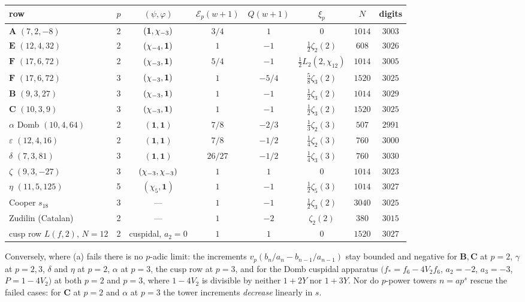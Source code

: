 \begin{verification}
\smallskip
\begin{center}\small
\renewcommand{\arraystretch}{1.2}
\begin{tabular}{@{}l c c c c c c c@{}}
\toprule
row & $p$ & $(\psi,\varphi)$ & $\mathcal E_p(w{+}1)$ & $Q(w{+}1)$ & $\xi_p$ & $N$ & digits\\
\midrule
$\mathbf A$ $(7,2,-8)$    & 2 & $(\mathbf 1,\chi_{-3})$ & $3/4$ & $1$ & $0$ & $1014$ & $3003$\\
$\mathbf E$ $(12,4,32)$   & 2 & $(\chi_{-4},\mathbf 1)$ & $1$ & $-1$ & $\tfrac12\zeta_2(2)$ & $608$ & $3026$\\
$\mathbf F$ $(17,6,72)$   & 2 & $(\chi_{-3},\mathbf 1)$ & $5/4$ & $-1$ & $\tfrac12L_2(2,\chi_{12})$ & $1014$ & $3005$\\
$\mathbf F$ $(17,6,72)$   & 3 & $(\chi_{-3},\mathbf 1)$ & $1$ & $-5/4$ & $\tfrac58\zeta_3(2)$ & $1520$ & $3025$\\
$\mathbf B$ $(9,3,27)$    & 3 & $(\chi_{-3},\mathbf 1)$ & $1$ & $-1$ & $\tfrac12\zeta_3(2)$ & $1014$ & $3029$\\
$\mathbf C$ $(10,3,9)$    & 3 & $(\chi_{-3},\mathbf 1)$ & $1$ & $-1$ & $\tfrac12\zeta_3(2)$ & $1520$ & $3025$\\
$\alpha$ Domb $(10,4,64)$ & 2 & $(\mathbf 1,\mathbf 1)$ & $7/8$ & $-2/3$ & $\tfrac13\zeta_2(3)$ & $507$ & $2991$\\
$\varepsilon$ $(12,4,16)$ & 2 & $(\mathbf 1,\mathbf 1)$ & $7/8$ & $-1/2$ & $\tfrac14\zeta_2(3)$ & $760$ & $3000$\\
$\delta$ $(7,3,81)$       & 3 & $(\mathbf 1,\mathbf 1)$ & $26/27$ & $-1/2$ & $\tfrac14\zeta_3(3)$ & $760$ & $3030$\\
$\zeta$ $(9,3,-27)$       & 3 & $(\chi_{-3},\chi_{-3})$ & $1$ & $1$ & $0$ & $1014$ & $3023$\\
$\eta$ $(11,5,125)$       & 5 & $(\chi_5,\mathbf 1)$ & $1$ & $-1$ & $\tfrac12\zeta_5(3)$ & $1014$ & $3027$\\
\midrule
Cooper $s_{18}$           & 3 & --- & $1$ & $-1$ & $\tfrac12\zeta_3(2)$ & $3040$ & $3025$\\
Zudilin (Catalan)         & 2 & --- & $1$ & $-2$ & $\zeta_2(2)$ & $380$ & $3015$\\
cusp row $L(f,2)$, $N{=}12$ & 2 & cuspidal, $a_2{=}0$ & $1$ & $1$ & $0$ & $1520$ & $3027$\\
\bottomrule
\end{tabular}
\end{center}
\smallskip

Conversely, where (a) fails there is no $p$-adic limit: the increments
$v_p(b_n/a_n-b_{n-1}/a_{n-1})$ stay bounded and negative for $\mathbf B,
\mathbf C$ at $p=2$, $\gamma$ at $p=2,3$, $\delta$ and $\eta$ at $p=2$,
$\alpha$ at $p=3$, the cusp row at $p=3$, and for the Domb cuspidal apparatus
$\bigl(f_*=f_6-4V_2f_6$, $a_2=-2$, $a_3=-3$, $P=1-4V_2\bigr)$ at both $p=2$
and $p=3$, where $1-4V_2$ is divisible by neither $1+2Y$ nor $1+3Y$.  Nor do
$p$-power towers $n=ap^s$ rescue the failed cases: for $\mathbf C$ at $p=2$
and $\alpha$ at $p=3$ the tower increments \emph{decrease} linearly in $s$.
\end{verification}

